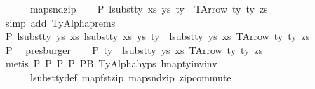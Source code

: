 \begin{isabellebody}
\ \ \ \ \ \ map{\isacharunderscore}{\kern0pt}snd{\isacharunderscore}{\kern0pt}zip{\isacharparenright}{\kern0pt}\isanewline
\isanewline
\ \ \isamarkupfalse%
\ P{}{}{\isacharcolon}{\kern0pt}\ {\isachardoublequoteopen}lsubst{\isacharunderscore}{\kern0pt}ty\ xs{\isacharprime}{\kern0pt}\ ys{\isacharprime}{\kern0pt}\ ty{\isacharprime}{\kern0pt}\ {\isacharequal}{\kern0pt}\ TArrow\ ty{}\ ty{}\ zs{\isachardoublequoteclose}\isanewline
\ \ \ \ \ \isamarkupfalse%
\ {\isacharparenleft}{\kern0pt}simp\ add{\isacharcolon}{\kern0pt}\ TyAlpha{\isachardot}{\kern0pt}prems{\isacharparenleft}{\kern0pt}{}{\isacharparenright}{\kern0pt}{\isacharparenright}{\kern0pt}\isanewline
\ \ \isamarkupfalse%
\ P{}{}{\isacharcolon}{\kern0pt}\ {\isachardoublequoteopen}lsubst{\isacharunderscore}{\kern0pt}ty\ ys{\isacharprime}{\kern0pt}\ xs{\isacharprime}{\kern0pt}\ {\isacharparenleft}{\kern0pt}lsubst{\isacharunderscore}{\kern0pt}ty\ xs{\isacharprime}{\kern0pt}\ ys{\isacharprime}{\kern0pt}\ ty{\isacharprime}{\kern0pt}{\isacharparenright}{\kern0pt}\ {\isacharequal}{\kern0pt}\ lsubst{\isacharunderscore}{\kern0pt}ty\ ys{\isacharprime}{\kern0pt}\ xs{\isacharprime}{\kern0pt}\ {\isacharparenleft}{\kern0pt}TArrow\ ty{}\ ty{}\ zs{\isacharparenright}{\kern0pt}{\isachardoublequoteclose}\isanewline
\ \ \ \ \ \isamarkupfalse%
\ P{}{}\ \isamarkupfalse%
\ presburger\isanewline
\ \ \isamarkupfalse%
\ P{}{}{\isacharcolon}{\kern0pt}\ {\isachardoublequoteopen}ty{\isacharprime}{\kern0pt}\ {\isacharequal}{\kern0pt}\ lsubst{\isacharunderscore}{\kern0pt}ty\ ys{\isacharprime}{\kern0pt}\ xs{\isacharprime}{\kern0pt}\ {\isacharparenleft}{\kern0pt}TArrow\ ty{}\ ty{}\ zs{\isacharparenright}{\kern0pt}{\isachardoublequoteclose}\isanewline
\ \ \ \ \isamarkupfalse%
\ {\isacharparenleft}{\kern0pt}metis\ P{}\ P{}{}\ P{}{}\ P{}{}\ P{}{}B\ TyAlpha{\isachardot}{\kern0pt}hyps{\isacharparenleft}{\kern0pt}{}{\isacharcomma}{\kern0pt}{}{\isacharcomma}{\kern0pt}{}{\isacharparenright}{\kern0pt}\ lmap{\isacharunderscore}{\kern0pt}ty{\isacharunderscore}{\kern0pt}inv{\isacharunderscore}{\kern0pt}inv\isanewline
\ \ \ \ \ \ lsubst{\isacharunderscore}{\kern0pt}ty{\isacharunderscore}{\kern0pt}def\ map{\isacharunderscore}{\kern0pt}fst{\isacharunderscore}{\kern0pt}zip\ map{\isacharunderscore}{\kern0pt}snd{\isacharunderscore}{\kern0pt}zip\ zip{\isacharunderscore}{\kern0pt}commute{\isacharparenright}{\kern0pt}\isanewline

\end{isabellebody}
